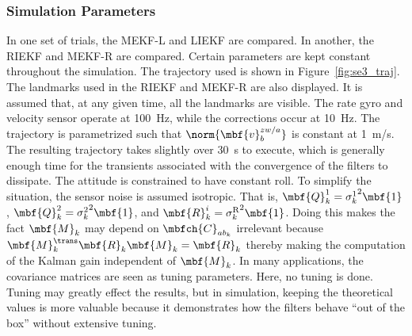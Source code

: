 \subsubsection{Simulation Parameters}

In one set of trials, the MEKF-L and LIEKF are compared. In another, the RIEKF and MEKF-R are compared. Certain parameters are kept constant throughout the simulation. The trajectory used is shown in Figure~\ref{fig:se3_traj}. The landmarks used in the RIEKF and MEKF-R are also displayed. It is assumed that, at any given time, all the landmarks are visible. The rate gyro and velocity sensor operate at \SI{100}{\Hz}, while the corrections occur at \SI{10}{\Hz}. The trajectory is parametrized such that $\norm{\mbf{v}_b^{zw/a}}$ is constant at \SI{1}{m/s}. The resulting trajectory takes slightly over \SI{30}{\second} to execute, which is generally enough time for the transients associated with the convergence of the filters to dissipate. The attitude is constrained to have constant roll. To simplify the situation, the sensor noise is assumed isotropic. That is, $\mbf{Q}_k^1 = {\sigma_k^1}^2\mbf{1}$, $\mbf{Q}_k^2 = {\sigma_k^2}^2\mbf{1}$, and $\mbf{R}_k^i = {\sigma_k^\textrm{R}}^2\mbf{1}$. Doing this makes the fact $\mbf{M}_k$ may depend on $\mbfch{C}_{ab_k}$ irrelevant because $\mbf{M}_k^\trans\mbf{R}_k \mbf{M}_k = \mbf{R}_k$ thereby making the computation of the Kalman gain independent of $\mbf{M}_k$. In many applications, the covariance matrices are seen as tuning parameters. Here, no tuning is done. Tuning may greatly effect the results, but in simulation, keeping the theoretical values is more valuable because it demonstrates how the filters behave ``out of the box'' without extensive tuning. 
